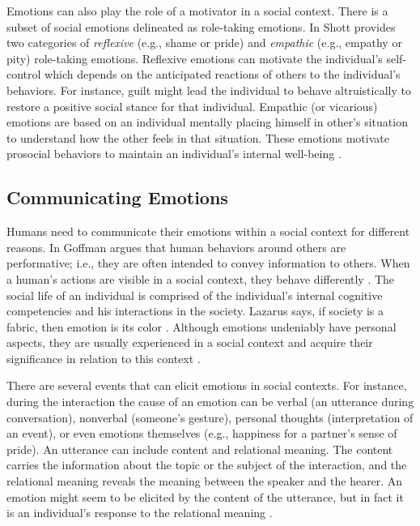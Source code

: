 \documentclass[12pt]{report}
\begin{document}
Emotions can also play the role of a motivator in a social context. There is a
subset of social emotions delineated as role-taking emotions. In
\cite{shott:emotion-social-life} Shott provides two categories of
\textit{reflexive} (e.g., shame or pride) and \textit{empathic} (e.g., empathy
or pity) role-taking emotions. Reflexive emotions can motivate the individual's
self-control which depends on the anticipated reactions of others to the
individual's behaviors. For instance, guilt might lead the individual to behave
altruistically to restore a positive social stance for that individual. Empathic
(or vicarious) emotions are based on an individual mentally placing himself in
other's situation to understand how the other feels in that situation. These
emotions motivate prosocial behaviors to maintain an individual's internal
well-being \cite{thoits:socialogy-emotion}.

\subsection{Communicating Emotions}
\label{section-emotion-comm}

Humans need to communicate their emotions within a social context for different
reasons. In \cite{goffman:self-presentation} Goffman argues that human behaviors
around others are performative; i.e., they are often intended to convey
information to others. When a human's actions are visible in a social context,
they behave differently \cite{zajonc:social-facilitation}. The social life of an
individual is comprised of the individual's internal cognitive competencies and
his interactions in the society. Lazarus says, if society is a fabric, then
emotion is its color \cite{lazarus:emotion-adaptation}. Although emotions
undeniably have personal aspects, they are usually experienced in a social
context and acquire their significance in relation to this context
\cite{parkinson:emotion-social-interaction}.

There are several events that can elicit emotions in social contexts. For
instance, during the interaction the cause of an emotion can be verbal (an
utterance during conversation), nonverbal (someone's gesture), personal thoughts
(interpretation of an event), or even emotions themselves (e.g., happiness for a
partner's sense of pride). An utterance can include content and relational
meaning. The content carries the information about the topic or the subject of
the interaction, and the relational meaning reveals the meaning between the
speaker and the hearer. An emotion might seem to be elicited by the content of
the utterance, but in fact it is an individual's response to the relational
meaning \cite{planalp:communicating-emotion}.
\end{document}
